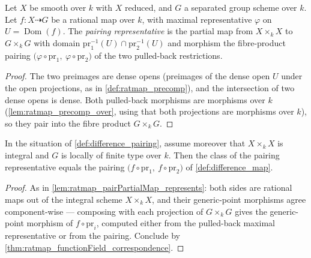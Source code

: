 \begin{definition}
  \label{def:difference_pairing}
  \leanok
  Let \(X\) be smooth over \(k\) with \(X\) reduced, and \(G\) a separated group
  scheme over \(k\). Let \(f : X \dashrightarrow G\) be a rational map over
  \(k\), with maximal representative \(\varphi\) on
  \(U = \operatorname{Dom}(f)\). The \emph{pairing representative} is the
  partial map from \(X \times_k X\) to \(G \times_k G\) with domain
  \(\mathrm{pr}_1^{-1}(U) \cap \mathrm{pr}_2^{-1}(U)\) and morphism the
  fibre-product pairing
  \(\bigl(\varphi \circ \mathrm{pr}_1,\ \varphi \circ \mathrm{pr}_2\bigr)\)
  of the two pulled-back restrictions.
\end{definition}
\begin{proof}
  \leanok
  The two preimages are dense opens (preimages of the dense open \(U\) under
  the open projections, as in \ref{def:ratmap_precomp}), and the intersection of
  two dense opens is dense. Both pulled-back morphisms are morphisms over
  \(k\) (\ref{lem:ratmap_precomp_over}, using that both projections are
  morphisms over \(k\)), so they pair into the fibre product
  \(G \times_k G\).
\end{proof}

\begin{lemma}
  \label{lem:difference_pairing_represents}
  \leanok
  In the situation of \ref{def:difference_pairing}, assume moreover that
  \(X \times_k X\) is integral and \(G\) is locally of finite type over \(k\).
  Then the class of the pairing representative equals the pairing
  \(\bigl(f \circ \mathrm{pr}_1,\ f \circ \mathrm{pr}_2\bigr)\) of
  \ref{def:difference_map}.
\end{lemma}
\begin{proof}
  \leanok
  As in \ref{lem:ratmap_pairPartialMap_represents}: both sides are rational maps
  out of the integral scheme \(X \times_k X\), and their generic-point morphisms
  agree component-wise --- composing with each projection of \(G \times_k G\)
  gives the generic-point morphism of \(f \circ \mathrm{pr}_i\), computed either
  from the pulled-back maximal representative or from the pairing. Conclude by
  \ref{thm:ratmap_functionField_correspondence}.
\end{proof}

